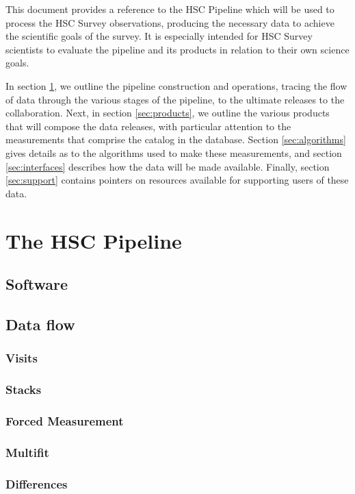 \documentclass[12pt]{article}
\begin{document}
This document provides a reference to the HSC Pipeline which will be
used to process the HSC Survey observations, producing the necessary
data to achieve the scientific goals of the survey.  It is
especially intended for HSC Survey scientists to evaluate the pipeline
and its products in relation to their own science goals.

In section \ref{sec:pipeline}, we outline the pipeline construction and operations, tracing the flow of data
through the various stages of the pipeline, to the ultimate releases to the collaboration.  Next, in section
\ref{sec:products}, we outline the various products that will compose the data releases, with particular
attention to the measurements that comprise the catalog in the database.  Section \ref{sec:algorithms} gives
details as to the algorithms used to make these measurements, and section \ref{sec:interfaces} describes how
the data will be made available.  Finally, section \ref{sec:support} contains pointers on resources available
for supporting users of these data.



\section{The HSC Pipeline}
\label{sec:pipeline}
\subsection{Software}
\subsection{Data flow}
\subsubsection{Visits}
\subsubsection{Stacks}
\subsubsection{Forced Measurement}
\subsubsection{Multifit}
\subsubsection{Differences}
\end{document}
